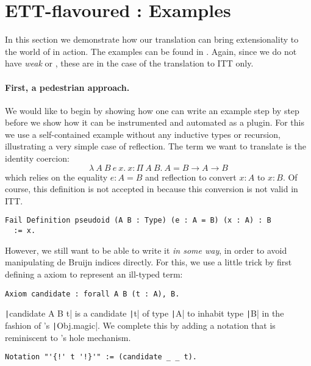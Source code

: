 \section{ETT-flavoured \Coq: Examples}

In this section we demonstrate how our translation can bring extensionality to
the world of \Coq in action. The examples can be found in
.
Again, since we do not have \emph{weak} \Coq or \MetaCoq, these are in the case
of the translation to \acrshort{ITT} only.

\paragraph{First, a pedestrian approach.}
%
We would like to begin by showing how one can write an example step by step
before we show how it can be instrumented and automated as a plugin.
For this we use a self-contained example without any inductive
types or recursion, illustrating a very simple case of reflection.
The term we want to translate is the identity coercion:
\[
  \lambda\ A\ B\ e\ x.\ x : \Pi\ A\ B.\ A = B \to
  A \to B
\]
which relies on the equality \(e : A = B\) and reflection to convert  \(x : A\)
to \(x : B\).
%
Of course, this definition is not accepted in \Coq because this
conversion is not valid in \acrshort{ITT}.
%
\begin{verbatim}
Fail Definition pseudoid (A B : Type) (e : A = B) (x : A) : B
  := x.
\end{verbatim}
%
However, we still want to be able to write it \emph{in some way}, in order to
avoid manipulating de Bruijn indices directly.
For this, we use a little trick by first defining a \Coq axiom to represent
an ill-typed term:
%
\begin{verbatim}
Axiom candidate : forall A B (t : A), B.
\end{verbatim}
%
\texttt|candidate A B t| is a candidate \texttt|t| of type
\texttt|A| to inhabit type \texttt|B| in the fashion of
\ocaml's \texttt|Obj.magic|.
We complete this by adding a notation that is reminiscent to \Agda's hole
mechanism.
%
\begin{verbatim}
Notation "'{!' t '!}'" := (candidate _ _ t).
\end{verbatim}

